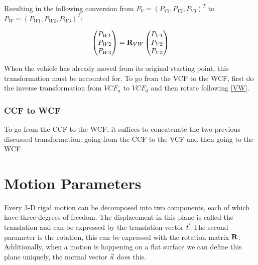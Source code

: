 Resulting in the following conversion from $P_V = (P_{V1}, P_{V2}, P_{V3})^T$ to $P_W = (P_{W1}, P_{W2}, P_{W3})^T$:

\begin{equation}\label{eq:VW}
    \begin{pmatrix}
        P_{W1} \\ P_{W2}\\ P_{W3}
    \end{pmatrix} = \mathbf{R}_{VW}\begin{pmatrix}
        P_{V1} \\ P_{V2}\\ P_{V3}
    \end{pmatrix}
\end{equation}

When the vehicle has already moved from its original starting point, this transformation must be accounted for. To go from the VCF to the WCF, first do the inverse transformation from $VCF_n$ to $VCF_0$ and then rotate following \autoref{VW}.

\subsubsection{CCF to WCF}
To go from the CCF to the WCF, it suffices to concatenate the two previous discussed transformation: going from the CCF to the VCF and then going to the WCF.

\section{Motion Parameters}
Every 3-D rigid motion can be decomposed into two components, each of which have three degrees of freedom. The displacement in this plane is called the translation and can be expressed by the translation vector $\vec t$. The second parameter is the rotation, this can be expressed with the rotation matrix $\mathbf{R}$. Additionally, when a motion is happening on a flat surface we can define this plane uniquely, the normal vector $\vec n$ does this.\bigskip

